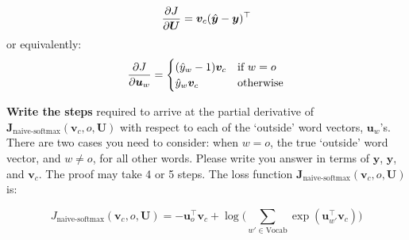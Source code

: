\begin{enumerate}[(a)]
        \begin{equation}
            {\partial J \over \partial \bm U } = {\bm v_c} (\hat{\bm y} - \bm y)^\top    
        \end{equation}
        or equivalently:
        \begin{align}
            {\partial J\over \partial \bm u_w} = 
            \begin{cases}
                (\hat{y}_w-1) {\bm v_c} & \text{if } w=o \\
            \hat{y}_w{\bm v_c} & \text{otherwise}
            \end{cases}
        \end{align}
    
        \textbf{Write the steps} required to arrive at the partial derivative of $\bm J_{\text{naive-softmax}}(\bm v_c, o, \bm U)$ with respect to each of the `outside' word vectors, $\bm u_w$'s. There are two cases you need to consider: when $w=o$, the true `outside' word vector, and $w \neq o$, for all other words. Please write you answer in terms of $\bm y$, $\hat{\bm y}$, and $\bm v_c$. The proof may take 4 or 5 steps. The loss function $\bm J_{\text{naive-softmax}}(\bm v_c, o, \bm U)$ is:

            \begin{equation*}
            J_{\text{naive-softmax}}(\bm v_c, o, \bm U) = - \bm u_{o}^\top \bm v_c + \log \bigg( \sum_{w' \in \text{Vocab}} \exp(\bm u_{w'}^\top \bm v_c) \bigg)
            \end{equation*}
\end{enumerate}
